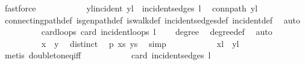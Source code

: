 \begin{isabellebody}
\ fastforce\isanewline
\ \ \ \ \ \ \ \ \isamarkupfalse%
\ \isamarkupfalse%
\ yl{\isacharunderscore}{\kern0pt}incident{\isacharcolon}{\kern0pt}\ {\isachardoublequoteopen}{\isacharbraceleft}{\kern0pt}y{\isacharcomma}{\kern0pt}l{\isacharbraceright}{\kern0pt}\ {\isasymin}\ incident{\isacharunderscore}{\kern0pt}sedges\ l{\isachardoublequoteclose}\ \isamarkupfalse%
\ conn{\isacharunderscore}{\kern0pt}path\ {\isacartoucheopen}y{\isasymnoteq}l{\isacartoucheclose}\isanewline
\ \ \ \ \ \ \ \ \ \ \isamarkupfalse%
\ connecting{\isacharunderscore}{\kern0pt}path{\isacharunderscore}{\kern0pt}def\ is{\isacharunderscore}{\kern0pt}gen{\isacharunderscore}{\kern0pt}path{\isacharunderscore}{\kern0pt}def\ is{\isacharunderscore}{\kern0pt}walk{\isacharunderscore}{\kern0pt}def\ incident{\isacharunderscore}{\kern0pt}sedges{\isacharunderscore}{\kern0pt}def\ incident{\isacharunderscore}{\kern0pt}def\ \isamarkupfalse%
\ auto\isanewline
\isanewline
\ \ \ \ \ \ \ \ \isamarkupfalse%
\ card{\isacharunderscore}{\kern0pt}loops{\isacharcolon}{\kern0pt}\ {\isachardoublequoteopen}card\ {\isacharparenleft}{\kern0pt}incident{\isacharunderscore}{\kern0pt}loops\ l{\isacharparenright}{\kern0pt}\ {\isacharequal}{\kern0pt}\ {}{\isachardoublequoteclose}\ \isamarkupfalse%
\ degree\ \isamarkupfalse%
\ degree{\isacharunderscore}{\kern0pt}def\ \isamarkupfalse%
\ auto\isanewline
\ \ \ \ \ \ \ \ \isamarkupfalse%
\ {\isachardoublequoteopen}x\ {\isasymnoteq}\ y{\isachardoublequoteclose}\ \isamarkupfalse%
\ distinct\ \isamarkupfalse%
\ p\ xs\ ys\ \isamarkupfalse%
\ simp\isanewline
\ \ \ \ \ \ \ \ \isamarkupfalse%
\ \isamarkupfalse%
\ {\isachardoublequoteopen}{\isacharbraceleft}{\kern0pt}x{\isacharcomma}{\kern0pt}l{\isacharbraceright}{\kern0pt}\ {\isasymnoteq}\ {\isacharbraceleft}{\kern0pt}y{\isacharcomma}{\kern0pt}l{\isacharbraceright}{\kern0pt}{\isachardoublequoteclose}\ \isamarkupfalse%
\ {\isacharparenleft}{\kern0pt}metis\ doubleton{\isacharunderscore}{\kern0pt}eq{\isacharunderscore}{\kern0pt}iff{\isacharparenright}{\kern0pt}\isanewline
\ \ \ \ \ \ \ \ \isamarkupfalse%
\ \isamarkupfalse%
\ {\isachardoublequoteopen}card\ {\isacharparenleft}{\kern0pt}incident{\isacharunderscore}{\kern0pt}sedges\ l{\isacharparenright}{\kern0pt}\ {\isasymnoteq}\ {}{\isachardoublequoteclose}\ \isamarkupfalse%

\end{isabellebody}
